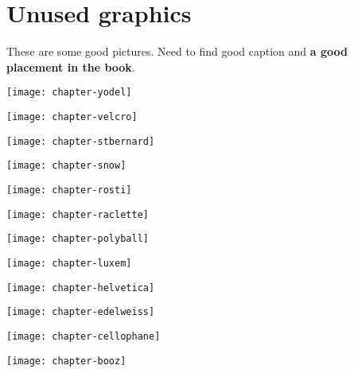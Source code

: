 \section{Unused graphics}

These are some good pictures. Need to find good caption and \textbf{a good placement in the book}.

\texttt{[image: chapter-yodel]}

\texttt{[image: chapter-velcro]}

\texttt{[image: chapter-stbernard]}

\texttt{[image: chapter-snow]}

\texttt{[image: chapter-rosti]}

\texttt{[image: chapter-raclette]}

\texttt{[image: chapter-polyball]}

\texttt{[image: chapter-luxem]}

\texttt{[image: chapter-helvetica]}

\texttt{[image: chapter-edelweiss]}

\texttt{[image: chapter-cellophane]}

\texttt{[image: chapter-booz]}
